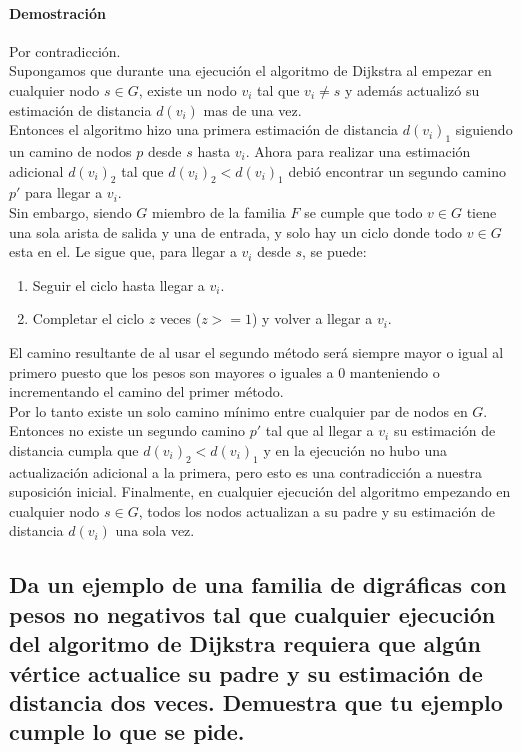 \documentclass[12pt]{article}
\begin{document}
	\paragraph{Demostración} Por contradicción.\\
	Supongamos que durante una ejecución el algoritmo de Dijkstra al empezar en cualquier nodo $s\in G$, existe un nodo $v_i$ tal que $v_i \neq s$ y además actualizó su estimación de distancia $d(v_i)$ mas de una vez.\\
	Entonces el algoritmo hizo una primera estimación de distancia $d(v_i)_1$ siguiendo un camino de nodos $p$ desde $s$ hasta $v_i$. Ahora para realizar una estimación adicional $d(v_i)_2$ tal que $d(v_i)_2 < d(v_i)_1$ debió encontrar un segundo camino $p'$ para llegar a $v_i$.\\
	Sin embargo, siendo $G$  miembro de la familia $F$ se cumple que todo $v\in G$ tiene una sola arista de salida y una de entrada, y solo hay un ciclo donde todo $v\in G$ esta en el. Le sigue que, para llegar a $v_i$ desde $s$, se puede:
	\begin{enumerate}
		\item Seguir el ciclo hasta llegar a $v_i$.
		\item Completar el ciclo $z$ veces ($z>=1$) y volver a llegar a $v_i$.
	\end{enumerate}  
	El camino resultante de al usar el segundo método será siempre mayor o igual al primero puesto que los pesos son mayores o iguales a 0 manteniendo o incrementando el camino del primer método.\\
	Por lo tanto existe un solo camino mínimo entre cualquier par de nodos en $G$. Entonces no existe un segundo camino $p'$ tal que al llegar a $v_i$ su estimación de distancia cumpla que $d(v_i)_2 < d(v_i)_1$ y en la ejecución no hubo una actualización adicional a la primera, pero esto es una contradicción a nuestra suposición inicial. Finalmente, en cualquier ejecución del algoritmo empezando en cualquier nodo $s\in G$, todos los nodos actualizan a su padre y su estimación de distancia $d(v_i)$ una sola vez.
	\pagebreak
	\subsection{Da un ejemplo de una familia de digráficas con pesos no negativos tal que cualquier ejecución del algoritmo de Dijkstra requiera que algún vértice actualice su padre y su estimación de distancia dos veces. Demuestra que tu ejemplo cumple lo que se pide.}
\end{document}
